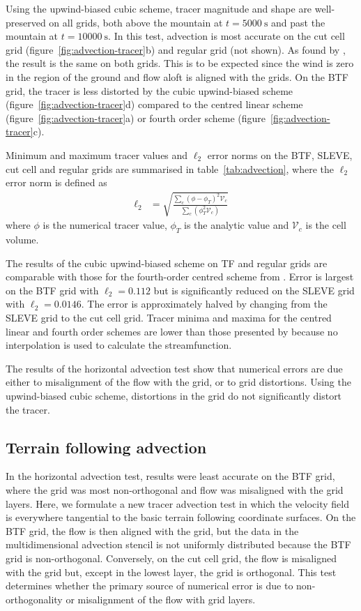 \documentclass{ametsoc}
\begin{document}
Using the upwind-biased cubic scheme, tracer magnitude and shape are well-preserved on all grids, both above the mountain at \(t = \SI{5000}{\second}\) and past the mountain at \(t = \SI{10000}{\second}\).  In this test, advection is most accurate on the cut cell grid (figure~\ref{fig:advection-tracer}b) and regular grid (not shown).  As found by \citet{good2014}, the result is the same on both grids.  This is to be expected since the wind is zero in the region of the ground and flow aloft is aligned with the grids.  On the BTF grid, the tracer is less distorted by the cubic upwind-biased scheme (figure~\ref{fig:advection-tracer}d) compared to the centred linear scheme (figure~\ref{fig:advection-tracer}a) or fourth order scheme (figure~\ref{fig:advection-tracer}c).

Minimum and maximum tracer values and \(\ell_2\) error norms on the BTF, SLEVE, cut cell and regular grids are summarised in table~\ref{tab:advection}, where the \(\ell_2\) error norm is defined as 
\begin{align}
	\ell_2 &= \sqrt{\frac{\sum_c \left( \phi - \phi_{T} \right)^2 \mathcal{V}_c}{\sum_c \left( \phi_T^2 \mathcal{V}_c \right)}} \label{eqn:l2-error}
\end{align}
where $\phi$ is the numerical tracer value, $\phi_T$ is the analytic value and $\mathcal{V}_c$ is the cell volume.

The results of the cubic upwind-biased scheme on TF and regular grids are comparable with those for the fourth-order centred scheme from \citet{schaer2002}.  Error is largest on the BTF grid with \(\ell_2 = \num{0.112}\) but is significantly reduced on the SLEVE grid with \(\ell_2 = \num{0.0146}\).  The error is approximately halved by changing from the SLEVE grid to the cut cell grid.
Tracer minima and maxima for the centred linear and fourth order schemes are lower than those presented by \citet{schaer2002} because no interpolation is used to calculate the streamfunction.

The results of the horizontal advection test show that numerical errors are due either to misalignment of the flow with the grid, or to grid distortions.  Using the upwind-biased cubic scheme, distortions in the grid do not significantly distort the tracer.


\subsection{Terrain following advection}
In the horizontal advection test, results were least accurate on the BTF grid, where the grid was most non-orthogonal and flow was misaligned with the grid layers.  Here, we formulate a new tracer advection test in which the velocity field is everywhere tangential to the basic terrain following coordinate surfaces.
On the BTF grid, the flow is then aligned with the grid, but the data in the multidimensional advection stencil is not uniformly distributed because the BTF grid is non-orthogonal.
Conversely, on the cut cell grid, the flow is misaligned with the grid but, except in the lowest layer, the grid is orthogonal.
This test determines whether the primary source of numerical error is due to non-orthogonality or misalignment of the flow with grid layers.
\end{document}
